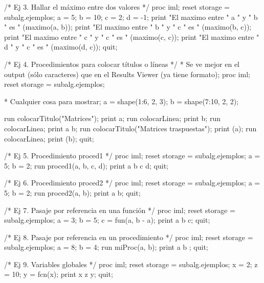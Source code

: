 \documentclass[
]{book}
\newenvironment{Shaded}{\begin{snugshade}}{\end{snugshade}}
\newcommand{\NormalTok}[1]{#1}
\begin{document}
\begin{Shaded}
\begin{Highlighting}[]
\NormalTok{/* Ej 3. Hallar el máximo entre dos valores */}
\NormalTok{proc iml;}
\NormalTok{    reset storage = subalg.ejemplos;}
\NormalTok{    a = 5;}
\NormalTok{    b = 10;}
\NormalTok{    c = 2;}
\NormalTok{    d = {-}1;}
\NormalTok{    print "El maximo entre " a " y " b " es " (maximo(a, b)); }
\NormalTok{    print "El maximo entre " b " y " c " es " (maximo(b, c)); }
\NormalTok{    print "El maximo entre " c " y " c " es " (maximo(c, c)); }
\NormalTok{    print "El maximo entre " d " y " c " es " (maximo(d, c)); }
\NormalTok{quit;}

\NormalTok{/* Ej 4. Procedimientos para colocar títulos o líneas */}
\NormalTok{* Se ve mejor en el output (sólo caracteres) que en el Results Viewer (ya tiene formato);}
\NormalTok{proc iml;}
\NormalTok{    reset storage = subalg.ejemplos;}

\NormalTok{    * Cualquier cosa para mostrar;}
\NormalTok{    a = shape(1:6, 2, 3);}
\NormalTok{    b = shape(7:10, 2, 2);}

\NormalTok{    run colocarTitulo("Matrices");}
\NormalTok{    print a;}
\NormalTok{    run colocarLinea;}
\NormalTok{    print b;}
\NormalTok{    run colocarLinea;}
\NormalTok{    print a b;}
\NormalTok{    run colocarTitulo("Matrices traspuestas");}
\NormalTok{    print (a\textasciigrave{});}
\NormalTok{    run colocarLinea;}
\NormalTok{    print (b\textasciigrave{});}
\NormalTok{quit;}

\NormalTok{/* Ej 5. Procedimiento proced1 */}
\NormalTok{proc iml;}
\NormalTok{    reset storage = subalg.ejemplos;}
\NormalTok{    a = 5;}
\NormalTok{    b = 2;}
\NormalTok{    run proced1(a, b, c, d);}
\NormalTok{    print a b c d; }
\NormalTok{quit;}

\NormalTok{/* Ej 6. Procedimiento proced2 */}
\NormalTok{proc iml;}
\NormalTok{    reset storage = subalg.ejemplos;}
\NormalTok{    a = 5;}
\NormalTok{    b = 2;}
\NormalTok{    run proced2(a, b);}
\NormalTok{    print a b; }
\NormalTok{quit;}

\NormalTok{/* Ej 7. Pasaje por referencia en una función */}
\NormalTok{proc iml;}
\NormalTok{    reset storage = subalg.ejemplos;}
\NormalTok{    a = 3;}
\NormalTok{    b = 5;}
\NormalTok{    c = fun(a, b {-} a);}
\NormalTok{    print a b c; }
\NormalTok{quit;}

\NormalTok{/* Ej 8. Pasaje por referencia en un procedimiento */}
\NormalTok{proc iml;}
\NormalTok{    reset storage = subalg.ejemplos;}
\NormalTok{    a = 8;}
\NormalTok{    b = 4;}
\NormalTok{    run miProc(a, b);}
\NormalTok{    print a b ; }
\NormalTok{quit;}

\NormalTok{/* Ej 9. Variables globales */}
\NormalTok{proc iml;}
\NormalTok{    reset storage = subalg.ejemplos;}
\NormalTok{    x = 2;}
\NormalTok{    z = 10;}
\NormalTok{    y = fcn(x);}
\NormalTok{    print x z y; }
\NormalTok{quit;}
\end{Highlighting}
\end{Shaded}


  
\end{document}
